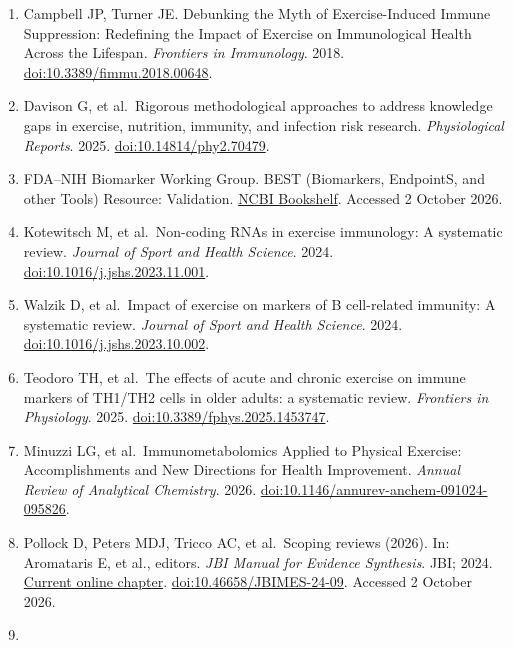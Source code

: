 \documentclass[
  11pt,
  a4paper,
]{article}
\providecommand{\tightlist}{%
  \setlength{\itemsep}{0pt}\setlength{\parskip}{0pt}}
\begin{document}
\begin{enumerate}
\def\labelenumi{\arabic{enumi}.}
\tightlist
\item
  Campbell JP, Turner JE. Debunking the Myth of Exercise-Induced Immune
  Suppression: Redefining the Impact of Exercise on Immunological Health
  Across the Lifespan. \emph{Frontiers in Immunology}. 2018.
  \href{https://doi.org/10.3389/fimmu.2018.00648}{doi:10.3389/fimmu.2018.00648}.
\item
  Davison G, et al.~Rigorous methodological approaches to address
  knowledge gaps in exercise, nutrition, immunity, and infection risk
  research. \emph{Physiological Reports}. 2025.
  \href{https://doi.org/10.14814/phy2.70479}{doi:10.14814/phy2.70479}.
\item
  FDA--NIH Biomarker Working Group. BEST (Biomarkers, EndpointS, and
  other Tools) Resource: Validation.
  \href{https://www.ncbi.nlm.nih.gov/books/NBK464453/}{NCBI Bookshelf}.
  Accessed 2 October 2026.
\item
  Kotewitsch M, et al.~Non-coding RNAs in exercise immunology: A
  systematic review. \emph{Journal of Sport and Health Science}. 2024.
  \href{https://doi.org/10.1016/j.jshs.2023.11.001}{doi:10.1016/j.jshs.2023.11.001}.
\item
  Walzik D, et al.~Impact of exercise on markers of B cell-related
  immunity: A systematic review. \emph{Journal of Sport and Health
  Science}. 2024.
  \href{https://doi.org/10.1016/j.jshs.2023.10.002}{doi:10.1016/j.jshs.2023.10.002}.
\item
  Teodoro TH, et al.~The effects of acute and chronic exercise on immune
  markers of TH1/TH2 cells in older adults: a systematic review.
  \emph{Frontiers in Physiology}. 2025.
  \href{https://doi.org/10.3389/fphys.2025.1453747}{doi:10.3389/fphys.2025.1453747}.
\item
  Minuzzi LG, et al.~Immunometabolomics Applied to Physical Exercise:
  Accomplishments and New Directions for Health Improvement.
  \emph{Annual Review of Analytical Chemistry}. 2026.
  \href{https://doi.org/10.1146/annurev-anchem-091024-095826}{doi:10.1146/annurev-anchem-091024-095826}.
\item
  Pollock D, Peters MDJ, Tricco AC, et al.~Scoping reviews (2026). In:
  Aromataris E, et al., editors. \emph{JBI Manual for Evidence
  Synthesis}. JBI; 2024.
  \href{https://jbi-global.atlassian.net/wiki/spaces/MANUAL/pages/355862497}{Current
  online chapter}.
  \href{https://doi.org/10.46658/JBIMES-24-09}{doi:10.46658/JBIMES-24-09}.
  Accessed 2 October 2026.
\item

\end{enumerate}
\end{document}
